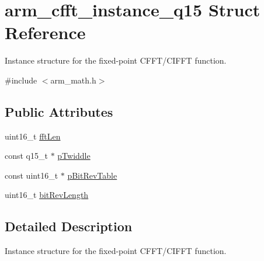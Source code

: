 \hypertarget{structarm__cfft__instance__q15}{\section{arm\-\_\-cfft\-\_\-instance\-\_\-q15 Struct Reference}
\label{structarm__cfft__instance__q15}
}


Instance structure for the fixed-\/point C\-F\-F\-T/\-C\-I\-F\-F\-T function.  




{\ttfamily \#include $<$arm\-\_\-math.\-h$>$}

\subsection*{Public Attributes}
\begin{DoxyCompactItemize}
\item 
uint16\-\_\-t \hyperlink{structarm__cfft__instance__q15_a5f9e1d3a8c127ee323b5e6929aeb90df}{fft\-Len}
\item 
const q15\-\_\-t $\ast$ \hyperlink{structarm__cfft__instance__q15_afdaf12ce4687cec021c5ae73d0987a3f}{p\-Twiddle}
\item 
const uint16\-\_\-t $\ast$ \hyperlink{structarm__cfft__instance__q15_ac9160b80243b99a0b6e2f75ddb5cf0ae}{p\-Bit\-Rev\-Table}
\item 
uint16\-\_\-t \hyperlink{structarm__cfft__instance__q15_a738907cf34bdbbaf724414ac2decbc3c}{bit\-Rev\-Length}
\end{DoxyCompactItemize}


\subsection{Detailed Description}
Instance structure for the fixed-\/point C\-F\-F\-T/\-C\-I\-F\-F\-T function. 


